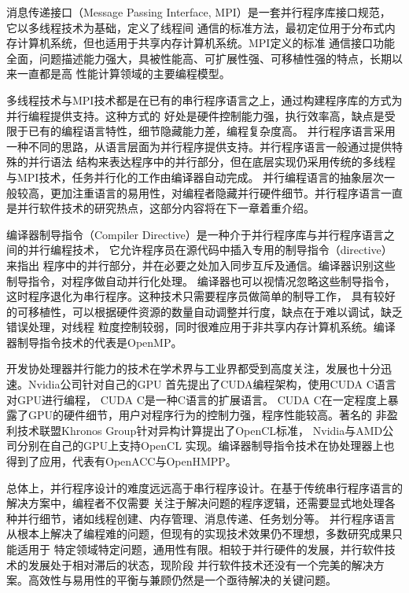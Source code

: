 消息传递接口（Message Passing Interface, MPI）是一套并行程序库接口规范，
它以多线程技术为基础，定义了线程间
通信的标准方法，最初定位用于分布式内存计算机系统，但也适用于共享内存计算机系统。MPI定义的标准
通信接口功能全面，问题描述能力强大，具被性能高、可扩展性强、可移植性强的特点，长期以来一直都是高
性能计算领域的主要编程模型。

多线程技术与MPI技术都是在已有的串行程序语言之上，通过构建程序库的方式为并行编程提供支持。这种方式的
好处是硬件控制能力强，执行效率高，缺点是受限于已有的编程语言特性，细节隐藏能力差，编程复杂度高。
并行程序语言采用一种不同的思路，从语言层面为并行程序提供支持。并行程序语言一般通过提供特殊的并行语法
结构来表达程序中的并行部分，但在底层实现仍采用传统的多线程与MPI技术，任务并行化的工作由编译器自动完成。
并行编程语言的抽象层次一般较高，更加注重语言的易用性，对编程者隐藏并行硬件细节。并行程序语言一直
是并行软件技术的研究热点，这部分内容将在下一章着重介绍。

编译器制导指令（Compiler Directive）是一种介于并行程序库与并行程序语言之间的并行编程技术，
它允许程序员在源代码中插入专用的制导指令（directive）来指出
程序中的并行部分，并在必要之处加入同步互斥及通信。编译器识别这些制导指令，对程序做自动并行化处理。
编译器也可以视情况忽略这些制导指令，这时程序退化为串行程序。这种技术只需要程序员做简单的制导工作，
具有较好的可移植性，可以根据硬件资源的数量自动调整并行度，缺点在于难以调试，缺乏错误处理，对线程
粒度控制较弱，同时很难应用于非共享内存计算机系统。编译器制导指令技术的代表是OpenMP。

开发协处理器并行能力的技术在学术界与工业界都受到高度关注，发展也十分迅速。Nvidia公司针对自己的GPU
首先提出了CUDA编程架构，使用CUDA C语言对GPU进行编程，
CUDA C是一种C语言的扩展语言。
CUDA C在一定程度上暴露了GPU的硬件细节，用户对程序行为的控制力强，程序性能较高。著名的
非盈利技术联盟Khronos Group针对异构计算提出了OpenCL标准，
Nvidia与AMD公司分别在自己的GPU上支持OpenCL
实现。编译器制导指令技术在协处理器上也得到了应用，代表有OpenACC与OpenHMPP。

总体上，并行程序设计的难度远远高于串行程序设计。在基于传统串行程序语言的解决方案中，编程者不仅需要
关注于解决问题的程序逻辑，还需要显式地处理各种并行细节，诸如线程创建、内存管理、消息传递、任务划分等。
并行程序语言从根本上解决了编程难的问题，但现有的实现技术效果仍不理想，多数研究成果只能适用于
特定领域特定问题，通用性有限。相较于并行硬件的发展，并行软件技术的发展处于相对滞后的状态，现阶段
并行软件技术还没有一个完美的解决方案。高效性与易用性的平衡与兼顾仍然是一个亟待解决的关键问题。

